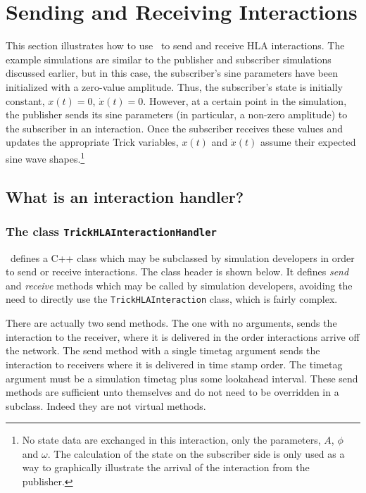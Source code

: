 \chapter{Sending and Receiving Interactions}
\label{sec:hla-inter}

This section illustrates how to use \TrickHLA\ to
send and receive HLA interactions.
The example simulations are similar to the publisher and
subscriber simulations discussed earlier, but in this case,
the subscriber's sine parameters have been initialized with
a zero-value amplitude.
Thus, the subscriber's state is initially constant,
$x(t)=0$, $\dot{x}(t)=0$.
However, at a certain point in the simulation,
the publisher sends its sine parameters
(in particular, a non-zero amplitude)
to the subscriber in an interaction.
Once the subscriber receives these values and updates the appropriate
Trick variables, $x(t)$ and $\dot{x}(t)$ assume their expected sine wave
shapes.\footnote{
  No state data are exchanged in this interaction, only the
  \simplesine parameters, $A$, $\phi$ and $\omega$.
  The calculation of the state on the subscriber side is only used as a
  way to graphically illustrate the arrival of the interaction from the
  publisher.
}

\section{What is an interaction handler?}
\subsection{The class {\tt TrickHLAInteractionHandler}}

\TrickHLA\ defines a C++ class which may be subclassed by
simulation developers in order to send or receive interactions.
The class header is shown below.
It defines {\em send} and {\em receive} methods which may be called
by simulation developers,
avoiding the need to directly use the {\tt TrickHLAInteraction} class,
which is fairly complex.

There are actually two send methods.
The one with no arguments, sends the interaction to the receiver,
where it is delivered in the order interactions arrive off the network.
The send method with a single timetag argument sends the interaction
to receivers where it is delivered in time stamp order.
The timetag argument must be a simulation timetag plus some lookahead
interval.
These send methods are sufficient unto themselves and do not need to
be overridden in a subclass.  Indeed they are not virtual methods.

